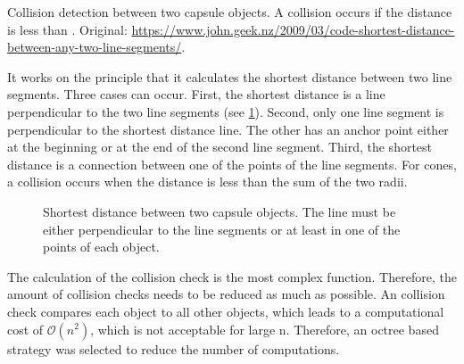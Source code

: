 % 
\begin{lstfloat}[!t]
    \caption{Collision detection between two capsule objects. A collision occurs if the distance is less than . Original: \href{https://www.john.geek.nz/2009/03/code-shortest-distance-between-any-two-line-segments/}{https://www.john.geek.nz/2009/03/code-shortest-distance-between-any-two-line-segments/}.}
    \label{alg:pseudocodeCollisionDetection}
\end{lstfloat}
%
It works on the principle that it calculates the shortest distance between two line segments.
Three cases can occur.
First, the shortest distance is a line perpendicular to the two line segments (see \cref{fig:shortDist}).
Second, only one line segment is perpendicular to the shortest distance line.
The other has an anchor point either at the beginning or at the end of the second line segment.
Third, the shortest distance is a connection between one of the points of the line segments.
For cones, a collision occurs when the distance is less than the sum of the two radii.
\par
% 
\begin{figure}[!t]
    \centering
    \def\tikzheight{0.5\textwidth}
	\caption{Shortest distance between two capsule objects. The line must be either perpendicular to the line segments or at least in one of the points of each object.}
	\label{fig:shortDist}
\end{figure}
% 
The calculation of the collision check is the most complex function.
Therefore, the amount of collision checks needs to be reduced as much as possible.
An collision check compares each object to all other objects, which leads to a computational cost of $\mathcal{O}(n^{2})$, which is not acceptable for large n.
Therefore, an octree based strategy was selected to reduce the number of computations.
%
% 
% 

